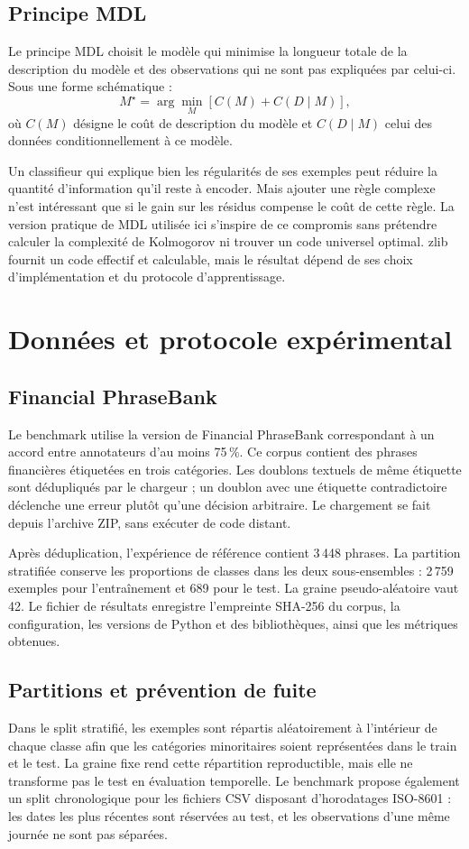 \documentclass[11pt,a4paper]{article}
\begin{document}
\subsection{Principe MDL}
Le principe MDL choisit le modèle qui minimise la longueur totale de la
description du modèle et des observations qui ne sont pas expliquées par
celui-ci. Sous une forme schématique :
\[
  M^\star = \arg\min_M \left[C(M)+C(D\mid M)\right],
\]
où $C(M)$ désigne le coût de description du modèle et $C(D\mid M)$ celui des
données conditionnellement à ce modèle.

Un classifieur qui explique bien les régularités de ses exemples peut réduire
la quantité d'information qu'il reste à encoder. Mais ajouter une règle
complexe n'est intéressant que si le gain sur les résidus compense le coût de
cette règle. La version pratique de MDL utilisée ici s'inspire de ce
compromis sans prétendre calculer la complexité de Kolmogorov ni trouver un
code universel optimal. zlib fournit un code effectif et calculable, mais le
résultat dépend de ses choix d'implémentation et du protocole d'apprentissage.

\section{Données et protocole expérimental}

\subsection{Financial PhraseBank}
Le benchmark utilise la version de Financial PhraseBank correspondant à un
accord entre annotateurs d'au moins 75\,\%. Ce corpus contient des phrases
financières étiquetées en trois catégories. Les doublons textuels de même
étiquette sont dédupliqués par le chargeur ; un doublon avec une étiquette
contradictoire déclenche une erreur plutôt qu'une décision arbitraire.
Le chargement se fait depuis l'archive ZIP, sans exécuter de code distant.

Après déduplication, l'expérience de référence contient 3\,448 phrases.
La partition stratifiée conserve les proportions de classes dans les deux
sous-ensembles : 2\,759 exemples pour l'entraînement et 689 pour le test.
La graine pseudo-aléatoire vaut 42. Le fichier de résultats enregistre
l'empreinte SHA-256 du corpus, la configuration, les versions de Python et
des bibliothèques, ainsi que les métriques obtenues.

\subsection{Partitions et prévention de fuite}
Dans le split stratifié, les exemples sont répartis aléatoirement à l'intérieur
de chaque classe afin que les catégories minoritaires soient représentées
dans le train et le test. La graine fixe rend cette répartition reproductible,
mais elle ne transforme pas le test en évaluation temporelle. Le benchmark
propose également un split chronologique pour les fichiers CSV disposant
d'horodatages ISO-8601 : les dates les plus récentes sont réservées au test,
et les observations d'une même journée ne sont pas séparées.
\end{document}
